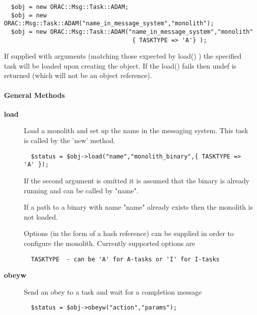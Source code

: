 \begin{description}
\begin{description}
\begin{verbatim}
  $obj = new ORAC::Msg::Task::ADAM;
  $obj = new ORAC::Msg::Task::ADAM("name_in_message_system","monolith");
  $obj = new ORAC::Msg::Task::ADAM("name_in_message_system","monolith"
                                    { TASKTYPE => 'A'} );
\end{verbatim}


If supplied with arguments (matching those expected by load() ) the
specified task will be loaded upon creating the object. If the load()
fails then undef is returned (which will not be an object reference).

\end{description}
\paragraph*{General Methods\label{ORAC::Msg::Task::ADAM_General_Methods}}
\begin{description}

\item[{\textbf{load}}] \mbox{}

Load a monolith and set up the name in the messaging system.
This task is called by the 'new' method.

\begin{verbatim}
  $status = $obj->load("name","monolith_binary",{ TASKTYPE => 'A' });
\end{verbatim}


If the second argument is omitted it is assumed that the binary
is already running and can be called by "name".



If a path to a binary with name "name" already exists then the monolith
is not loaded.



Options (in the form of a hash reference) can be supplied
in order to configure the monolith. Currently supported options
are

\begin{verbatim}
  TASKTYPE  - can be 'A' for A-tasks or 'I' for I-tasks
\end{verbatim}

\item[{\textbf{obeyw}}] \mbox{}

Send an obey to a task and wait for a completion message

\begin{verbatim}
  $status = $obj->obeyw("action","params");
\end{verbatim}


\end{description}
\end{description}
